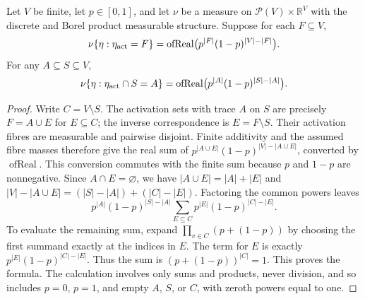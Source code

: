 \begin{helper}
Let $V$ be finite, let $p\in[0,1]$, and let $\nu$ be a measure on
$\mathcal P(V)\times\mathbb R^V$ with the discrete and Borel product
measurable structure. Suppose for each $F\subseteq V$,
\[
 \nu\{\eta:\eta_{\rm act}=F\}
 =\operatorname{ofReal}\bigl(p^{|F|}(1-p)^{|V|-|F|}\bigr).
\]
For any $A\subseteq S\subseteq V$,
\[
 \nu\{\eta:\eta_{\rm act}\cap S=A\}
 =\operatorname{ofReal}\bigl(p^{|A|}(1-p)^{|S|-|A|}\bigr).
\]
\end{helper}
\begin{proof}
Write $C=V\setminus S$. The activation sets with trace $A$ on $S$
are precisely $F=A\cup E$ for $E\subseteq C$; the inverse correspondence
is $E=F\setminus S$. Their activation fibres are measurable and pairwise
disjoint. Finite additivity and the assumed fibre masses therefore give
the real sum of $p^{|A\cup E|}(1-p)^{|V|-|A\cup E|}$, converted by
$\operatorname{ofReal}$. This conversion commutes with the finite sum
because $p$ and $1-p$ are nonnegative.
Since $A\cap E=\varnothing$, we have
$|A\cup E|=|A|+|E|$ and
$|V|-|A\cup E|=(|S|-|A|)+(|C|-|E|)$.
Factoring the common powers leaves
\[
 p^{|A|}(1-p)^{|S|-|A|}
 \sum_{E\subseteq C}p^{|E|}(1-p)^{|C|-|E|}.
\]
To evaluate the remaining sum, expand
$\prod_{v\in C}(p+(1-p))$ by choosing the first summand exactly at the
indices in $E$. The term for $E$ is exactly
$p^{|E|}(1-p)^{|C|-|E|}$. Thus the sum is
$(p+(1-p))^{|C|}=1$. This proves the formula. The calculation involves
only sums and products, never division, and so includes $p=0$, $p=1$,
and empty $A$, $S$, or $C$, with zeroth powers equal to one.
\end{proof}
